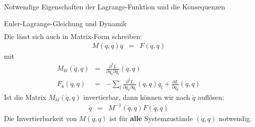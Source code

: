 \begin{chapter}{\titlestr}
\begin{appendix}
\begin{section}{Notwendige Eigenschaften der Lagrange-Funktion und die Konsequenzen}
\begin{subsection}{Euler-Lagrange-Gleichung und Dynamik}
\begin{eqnarray*}
\end{eqnarray*}
Die lässt sich auch in Matrix-Form schreiben:
\begin{eqnarray*}
M(\dot{q},q)\ddot{q} &=& F(\dot{q},q)
\end{eqnarray*}
mit
\begin{eqnarray*}
M_{kl}(\dot{q},q) &=& \frac{\partial^2 L}{\partial \dot{q}_k\partial \dot{q}_l}(\dot{q},q)\\
F_k(\dot{q},q) &=& -\sum_l\frac{\partial^2 L}{\partial \dot{q}_k\partial q_l}(\dot{q},q)\dot{q}_l+\frac{\partial L}{\partial q_k}(\dot{q},q)
\end{eqnarray*}
Ist die Matrix $M_{kl}(\dot{q},q)$ invertierbar, dann können wir nach $\ddot{q}$ auflösen:
\begin{eqnarray*}
\ddot{q} &=& M^{-1}(\dot{q},q)F(\dot{q},q)
\end{eqnarray*}
Die Invertierbarkeit von $M(\dot{q},q)$ ist für \textbf{alle} Systemzustände $(\dot{q},q)$ notwendig.
\end{subsection}


\end{section}
\end{appendix}
\end{chapter}
